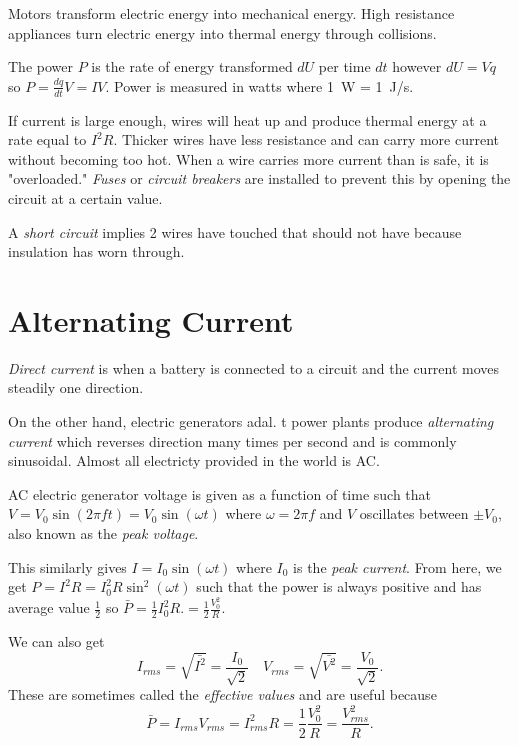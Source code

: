 \begin{note}
    Motors transform electric energy into mechanical energy. High resistance appliances turn electric energy into thermal energy through collisions.
\end{note}
\begin{definition}[Power]
    The power $P$ is the rate of energy transformed $dU$ per time $dt$ however $dU = Vq$ so $P = \frac{dq}{dt}V = IV$. Power is measured in watts where \qty{1}{W} = \qty{1}{J/s}.
\end{definition}
\begin{definition}
    If current is large enough, wires will heat up and produce thermal energy at a rate equal to $I^2R$. Thicker wires have less resistance and can carry more current without becoming too hot. When a wire carries more current than is safe, it is "overloaded." \emph{Fuses} or \emph{circuit breakers} are installed to prevent this by opening the circuit at a certain value.
\end{definition}
\begin{definition}
    A \emph{short circuit} implies 2 wires have touched that should not have because insulation has worn through.
\end{definition}

\section{Alternating Current}

\begin{definition}
    \emph{Direct current} is when a battery is connected to a circuit and the current moves steadily one direction.
\end{definition}
\begin{definition}
    On the other hand, electric generators adal. t power plants produce \emph{alternating current} which reverses direction many times per second and is commonly sinusoidal. Almost all electricty provided in the world is AC.
\end{definition}
\begin{definition}
    AC electric generator voltage is given as a function of time such that $V = V_0\sin(2\pi ft)=V_0\sin(\omega t)$ where $\omega = 2\pi f$ and $V$ oscillates between $\pm V_0$, also known as the \emph{peak voltage}. 
    
    This similarly gives $I = I_0\sin(\omega t)$ where $I_0$ is the \emph{peak current}. From here, we get $P = I^2 R = I_0^2R\sin^2(\omega t)$ such that the power is always positive and has average value $\frac{1}{2}$ so $\bar{P} = \frac{1}{2}I_0^2R. = \frac{1}{2}\frac{V_0^2}{R}.$

    We can also get $$I_{rms} = \sqrt{\bar{I^2}} = \frac{I_0}{\sqrt{2}} \quad V_{rms} = \sqrt{\bar{V^2}} = \frac{V_0}{\sqrt{2}}.$$ These are sometimes called the \emph{effective values} and are useful because $$\bar{P} = I_{rms}V_{rms} = I^2_{rms}R = \frac{1}{2}\frac{V_0^2}{R} = \frac{V_{rms}^2}{R}.$$
\end{definition}


